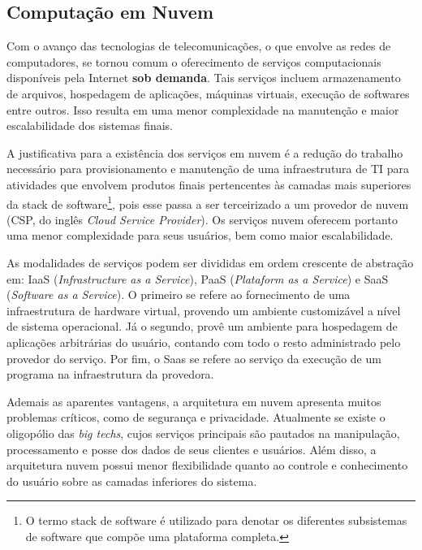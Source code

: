 \documentclass{article}
\begin{document}
\subsection{Computação em Nuvem}
Com o avanço das tecnologias de telecomunicações, o que envolve as redes de
computadores, se tornou comum o oferecimento de serviços computacionais
disponíveis pela Internet \textbf{sob demanda}. Tais serviços incluem
armazenamento de arquivos, hospedagem de aplicações, máquinas virtuais, execução
de softwares entre outros. Isso resulta em uma menor complexidade na manutenção
e maior escalabilidade dos sistemas finais.

A justificativa para a existência dos serviços em nuvem é a redução do trabalho
necessário para provisionamento e manutenção de uma infraestrutura de TI para
atividades que envolvem produtos finais pertencentes às camadas mais superiores
da stack de software\footnote{O termo stack de software é utilizado para denotar
os diferentes subsistemas de software que compõe uma plataforma completa.}, pois
esse passa a ser terceirizado a um provedor de nuvem (CSP, do inglês
\textit{Cloud Service Provider}). Os serviços nuvem oferecem portanto uma menor
complexidade para seus usuários, bem como maior escalabilidade.

As modalidades de serviços podem ser divididas em ordem crescente de abstração
em: IaaS (\textit{Infrastructure as a Service}), PaaS (\textit{Plataform as a
Service}) e SaaS (\textit{Software as a Service}). O primeiro se refere ao
fornecimento de uma infraestrutura de hardware virtual, provendo um ambiente
customizável a nível de sistema operacional. Já o segundo, provê um ambiente
para hospedagem de aplicações arbitrárias do usuário, contando com todo o resto
administrado pelo provedor do serviço. Por fim, o Saas se refere ao serviço da
execução de um programa na infraestrutura da provedora.

Ademais as aparentes vantagens, a arquitetura em nuvem apresenta muitos
problemas críticos, como de segurança e privacidade. Atualmente se existe o
oligopólio das \textit{big techs}, cujos serviços principais são pautados na
manipulação, processamento e posse dos dados de seus clientes e usuários. Além
disso, a arquitetura nuvem possui menor flexibilidade quanto ao controle e
conhecimento do usuário sobre as camadas inferiores do sistema.
\end{document}
